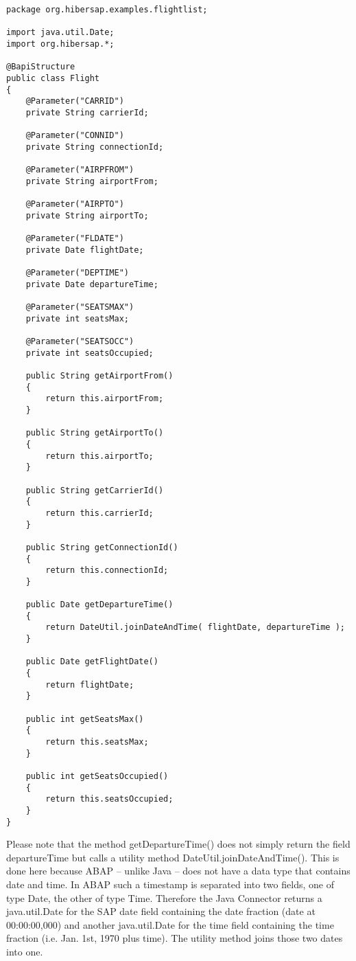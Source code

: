 \begin{lstlisting}[caption=The Flight class]
package org.hibersap.examples.flightlist;

import java.util.Date;
import org.hibersap.*;

@BapiStructure
public class Flight
{
    @Parameter("CARRID")
    private String carrierId;

    @Parameter("CONNID")
    private String connectionId;

    @Parameter("AIRPFROM")
    private String airportFrom;

    @Parameter("AIRPTO")
    private String airportTo;

    @Parameter("FLDATE")
    private Date flightDate;

    @Parameter("DEPTIME")
    private Date departureTime;

    @Parameter("SEATSMAX")
    private int seatsMax;

    @Parameter("SEATSOCC")
    private int seatsOccupied;

    public String getAirportFrom()
    {
        return this.airportFrom;
    }

    public String getAirportTo()
    {
        return this.airportTo;
    }

    public String getCarrierId()
    {
        return this.carrierId;
    }

    public String getConnectionId()
    {
        return this.connectionId;
    }

    public Date getDepartureTime()
    {
        return DateUtil.joinDateAndTime( flightDate, departureTime );
    }

    public Date getFlightDate()
    {
        return flightDate;
    }

    public int getSeatsMax()
    {
        return this.seatsMax;
    }

    public int getSeatsOccupied()
    {
        return this.seatsOccupied;
    }
}
\end{lstlisting}

Please note that the method getDepartureTime() does not simply return the field departureTime
but calls a utility method DateUtil.joinDateAndTime(). This is done here because ABAP -- unlike Java -- does not have a
data type that contains date and time. In ABAP such a timestamp is separated into two fields, one
of type Date, the other of type Time. Therefore the Java Connector returns a java.util.Date for the SAP
date field containing the date fraction (date at 00:00:00,000) and another java.util.Date for the time
field containing the time fraction (i.e. Jan. 1st, 1970 plus time). The utility method joins those two dates
into one.


